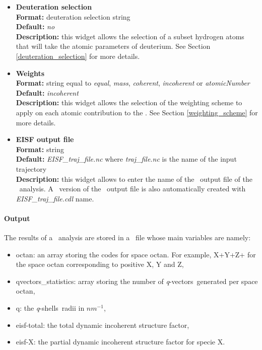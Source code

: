 \documentclass[a4paper,11pt]{report}
\newcommand{\invnm}{$nm^{-1}$}
\newcommand{\qvects}{\textit{q}-vectors}
\newcommand{\qshells}{\textit{q}-shells}
\begin{document}
\begin{itemize}
\hypertarget{eisf_deuteration_selection}{}
\item \textbf{Deuteration selection}\\
\textbf{Format:} deuteration selection string\\
\textbf{Default:} \textit{no}\\
\textbf{Description:} this widget allows the selection of a subset hydrogen atoms that will take the atomic parameters 
of deuterium. See Section \ref{deuteration_selection} for more details.

\hypertarget{eisf_weights}{}
\item \textbf{Weights}\\
\textbf{Format:} string equal to \textit{equal}, \textit{mass}, \textit{coherent}, \textit{incoherent} or \textit{atomicNumber}\\
\textbf{Default:} \textit{incoherent}\\
\textbf{Description:} this widget allows the selection of the weighting scheme to apply on each atomic contribution 
to the \DISF . See Section \ref{weighting_scheme} for more details. 

\hypertarget{eisf_eisf_output_file}{}
\item \textbf{EISF output file}\\
\textbf{Format:} string\\
\textbf{Default:} \textit{EISF\_traj\_file.nc} where \textit{traj\_file.nc} is the name of the input trajectory\\
\textbf{Description:} this widget allows to enter the name of the \NetCDF\ output file of the \EISF\ analysis. A \CDL\ 
version of the \NetCDF\ output file is also automatically created with \textit{EISF\_traj\_file.cdl} name.
\end{itemize}

\paragraph{Output\\}
The results of a \EISF\ analysis are stored in a \NetCDF\ file whose main variables are namely:
\begin{itemize}
\item octan: an array storing the codes for space octan. For example, X+Y+Z+ for the space octan corresponding to positive
X, Y and Z,
\item qvectors\_statistics: array storing the number of \qvects\ generated per space octan,
\item q: the \qshells\ radii in \invnm ,
\item eisf-total: the total dynamic incoherent structure factor,
\item eisf-X: the partial dynamic incoherent structure factor for specie X.
\end{itemize}
\end{document}
